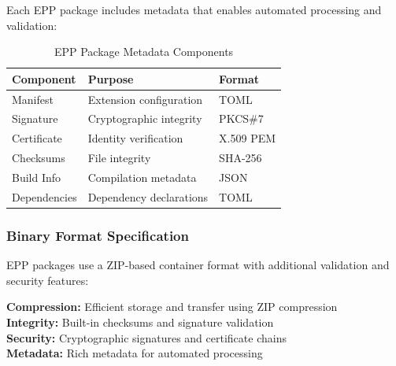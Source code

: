 Each EPP package includes metadata that enables automated processing and validation:

\begin{table}[h]
\centering
\caption{EPP Package Metadata Components}
\label{tab:epp-metadata-components}
\begin{tabular}{@{}lll@{}}
\toprule
\textbf{Component} & \textbf{Purpose} & \textbf{Format} \\
\midrule
Manifest & Extension configuration & TOML \\
Signature & Cryptographic integrity & PKCS\#7 \\
Certificate & Identity verification & X.509 PEM \\
Checksums & File integrity & SHA-256 \\
Build Info & Compilation metadata & JSON \\
Dependencies & Dependency declarations & TOML \\
\bottomrule
\end{tabular}
\end{table}

\subsubsection{Binary Format Specification}
\label{subsubsec:binary-format-specification}

EPP packages use a ZIP-based container format with additional validation and security features:

\begin{infobox}[title=EPP Format Benefits]
\textbf{Compression:} Efficient storage and transfer using ZIP compression \\
\textbf{Integrity:} Built-in checksums and signature validation \\
\textbf{Security:} Cryptographic signatures and certificate chains \\
\textbf{Metadata:} Rich metadata for automated processing
\end{infobox}

